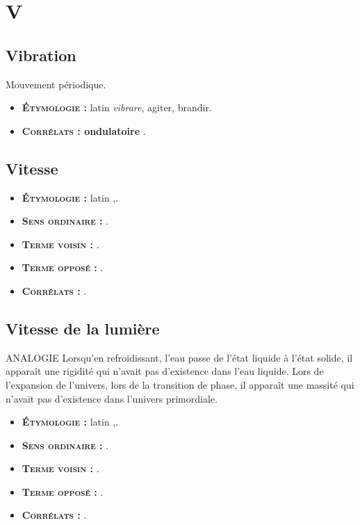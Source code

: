 \chapter{V}
\section{Vibration}
Mouvement périodique.
{\footnotesize
\begin{itemize}[leftmargin=1cm, label=, itemsep=1pt]
\item {\bf \textsc{Étymologie} :} latin {\it vibrare}, agiter, brandir.
\item {\bf \textsc{Corrélats} : ondulatoire} .
\end{itemize}
}

\section{Vitesse}
{\footnotesize
\begin{itemize}[leftmargin=1cm, label=, itemsep=1pt]
\item {\bf \textsc{Étymologie} :} latin {\it },.
\item {\bf \textsc{Sens ordinaire} :} .
\item {\bf \textsc{Terme voisin} :} .
\item {\bf \textsc{Terme opposé} :} .
\item {\bf \textsc{Corrélats} :} .
\end{itemize}
}

\section{Vitesse de la lumière}

ANALOGIE
Lorsqu'en refroidissant, l'eau passe de l'état liquide à l'état solide, il apparaît une rigidité qui n'avait pas d'existence dans l'eau liquide.
Lors de l'expansion de l'univers, lors de la transition de phase, il apparaît une massité qui n'avait pas d'existence dans l'univers primordiale.



{\footnotesize
\begin{itemize}[leftmargin=1cm, label=, itemsep=1pt]
\item {\bf \textsc{Étymologie} :} latin {\it },.
\item {\bf \textsc{Sens ordinaire} :} .
\item {\bf \textsc{Terme voisin} :} .
\item {\bf \textsc{Terme opposé} :} .
\item {\bf \textsc{Corrélats} :} .
\end{itemize}
}

